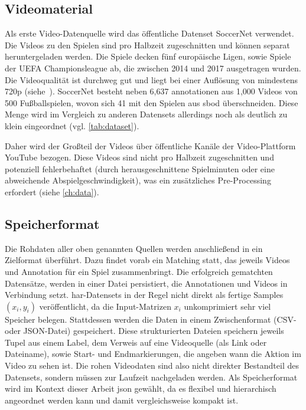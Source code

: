\subsection{Videomaterial}
\label{subsec:videomaterial}

Als erste Video-Datenquelle wird das öffentliche Datenset SoccerNet verwendet.
Die Videos zu den Spielen sind pro Halbzeit zugeschnitten und können separat heruntergeladen werden.
Die Spiele decken fünf europäische Ligen, sowie Spiele der UEFA Championsleague ab, die zwischen 2014 und 2017 ausgetragen wurden.
Die Videoqualität ist durchweg gut und liegt bei einer Auflösung von mindestens 720p (siehe~\cite{SoccerNet20}).
SoccerNet besteht neben 6,637 \gls{annotationen} aus 1,000 Videos von 500 Fußballspielen, wovon sich 41 mit den Spielen aus \gls{sbod} überschneiden.
Diese Menge wird im Vergleich zu anderen Datensets allerdings noch als deutlich zu klein eingeordnet (vgl. \autoref{tab:dataset}).

Daher wird der Großteil der Videos über öffentliche Kanäle der Video-Plattform YouTube bezogen.
Diese Videos sind nicht pro Halbzeit zugeschnitten und potenziell fehlerbehaftet (\zB durch herausgeschnittene Spielminuten oder eine abweichende Abspielgeschwindigkeit), was ein zusätzliches Pre-Processing erfordert (siehe \autoref{ch:data}).

\subsection{Speicherformat}
\label{subsec:zielformat}

Die Rohdaten aller oben genannten Quellen werden anschließend in ein Zielformat überführt.
Dazu findet vorab ein Matching statt, das jeweils Videos und Annotation für ein Spiel zusammenbringt.
Die erfolgreich gematchten Datensätze, werden in einer Datei persistiert, die Annotationen und Videos in Verbindung setzt.
\gls{har}-Datensets in der Regel nicht direkt als fertige Samples $(x_i, y_i)$ veröffentlicht, da die Input-Matrizen $x_i$ unkomprimiert sehr viel Speicher belegen.
Stattdessen werden die Daten in einem Zwischenformat (\zB CSV- oder JSON-Datei) gespeichert.
Diese strukturierten Dateien speichern jeweils Tupel aus einem Label, dem Verweis auf eine Videoquelle (als Link oder Dateiname), sowie Start- und Endmarkierungen, die angeben wann die Aktion im Video zu sehen ist.
Die rohen Videodaten sind also nicht direkter Bestandteil des Datensets, sondern müssen zur Laufzeit nachgeladen werden.
Als Speicherformat wird im Kontext dieser Arbeit \gls{json} gewählt, da es flexibel und hierarchisch angeordnet werden kann und damit vergleichsweise kompakt ist.

